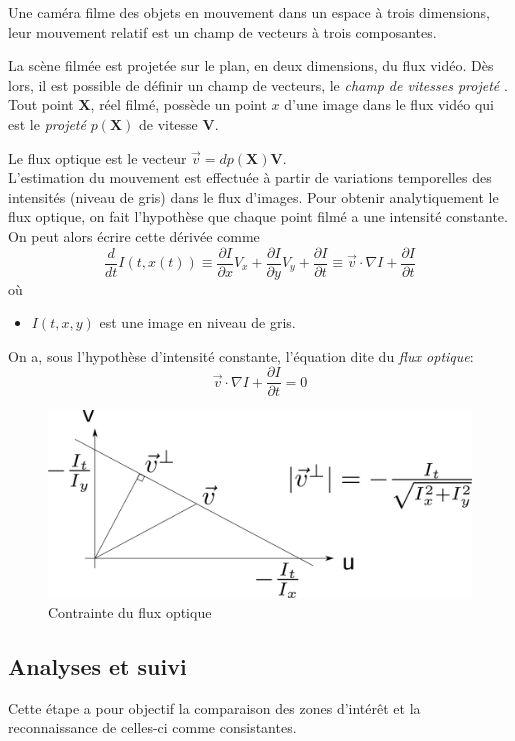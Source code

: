 \documentclass[a4paper,12pt]{report}
\begin{document}
Une caméra filme des objets en mouvement dans un espace à trois dimensions, leur mouvement relatif est un champ de vecteurs à trois composantes. 

La scène filmée est projetée sur le plan, en deux dimensions, du flux vidéo. Dès lors, il est possible de définir un champ de vecteurs, le \textit{champ de vitesses projeté} \cite{r}. \\

Tout point $\textbf{X}$, réel filmé, possède un point $x$ d'une image dans le flux vidéo qui est le \textit{projeté} $p(\textbf{X})$ de vitesse $\textbf{V}$. 

Le flux optique est le vecteur $\vec v = dp(\textbf{X})\textbf{V}$.\\
 
L'estimation du mouvement est effectuée à partir de variations temporelles des intensités (niveau de gris) dans le flux d'images. Pour obtenir analytiquement le flux optique, on fait l'hypothèse que chaque point filmé a une intensité constante. On peut alors écrire cette dérivée comme $$\frac{d}{dt}I(t,x(t)) \equiv \frac{\partial I}{\partial x}V_x+\frac{\partial I}{\partial y}V_y+\frac{\partial I}{\partial t} \equiv \vec v \cdot \nabla I + \frac{\partial I}{\partial t}$$
où 
\begin{itemize}
\item[] $I(t,x,y)$ est une image en niveau de gris.\\
\end{itemize}
On a, sous l'hypothèse d'intensité constante, l'équation dite du \textit{flux optique}:
$$\vec v \cdot \nabla I + \frac{\partial I}{\partial t} = 0 $$ 
\begin{figure}[hbtp]
\centering
\includegraphics[scale=0.4]{figureOpticalConstraint.png}
\caption{Contrainte du flux optique}
\end{figure}

\subsection{Analyses et suivi}
Cette étape a pour objectif la comparaison des zones d'intérêt et la reconnaissance de celles-ci comme consistantes.
\end{document}
